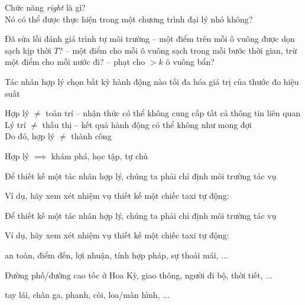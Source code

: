 \documentclass{article}
\begin{document}
\begin{huge}
Chức năng \emph{right} là gì? \\
Nó có thể được thực hiện trong một chương trình đại lý nhỏ không?


Đã sửa lỗi  đánh giá trình tự môi trường \note{}\al
-- một điểm trên mỗi ô vuông được dọn sạch kịp thời $T$?\al
-- một điểm cho mỗi ô vuông sạch trong mỗi bước thời gian, trừ một điểm cho mỗi nước đi?\al
-- phạt cho ${}> k$ ô vuông bẩn?

Tác nhân hợp lý \txr{} chọn bất kỳ hành động nào tối đa hóa giá trị  của
thước đo hiệu suất 

Hợp lý $\neq$ toàn trí \nl
   -- nhận thức có thể không cung cấp tất cả thông tin liên quan\\
Lý trí $\neq$ thấu thị \nl
   -- kết quả hành động có thể không như mong đợi\\
Do đó, hợp lý $\neq$ thành công

Hợp lý $\implies$ khám phá, học tập, tự chủ





Để thiết kế một tác nhân hợp lý, chúng ta phải chỉ định môi trường tác vụ \txr{}

Ví dụ, hãy xem xét nhiệm vụ thiết kế một chiếc taxi tự động:







Để thiết kế một tác nhân hợp lý, chúng ta phải chỉ định môi trường tác vụ \txr{}

Ví dụ, hãy xem xét nhiệm vụ thiết kế một chiếc taxi tự động:

 an toàn, điểm đến, lợi nhuận, tính hợp pháp, sự thoải mái, $\ldots$

 Đường phố/đường cao tốc ở Hoa Kỳ, giao thông, người đi bộ, thời tiết, $\ldots$

 tay lái, chân ga, phanh, còi, loa/màn hình, $\ldots$


\end{huge}
\end{document}
